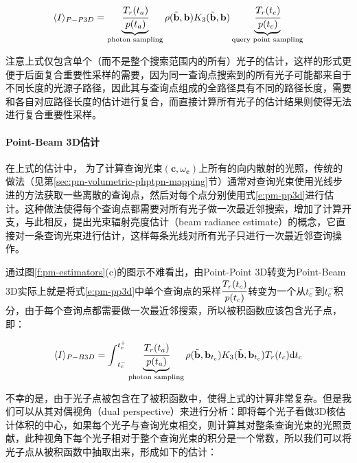\begin{equation}\label{e:pm-pp3d}
	\langle I\rangle_{P-P3D}=\underbrace{ \cfrac{T_r(t_a)}{p(t_a)}}_{\text{photon sampling}}\rho(\tilde{\mathbf{b}},\mathbf{b})K_3(\tilde{\mathbf{b}},\mathbf{b})\underbrace{ \cfrac{T_r(t_c)}{p(t_c)}}_{\text{query point sampling}}
\end{equation}

注意上式仅包含单个（而不是整个搜索范围内的所有）光子的估计，这样的形式更便于后面复合重要性采样的需要，因为同一查询点搜索到的所有光子可能都来自于不同长度的光源子路径，因此其与查询点组成的全路径具有不同的路径长度，需要和各自对应路径长度的估计进行复合，而直接计算所有光子的估计结果则使得无法进行复合重要性采样。




\paragraph{Point-Beam 3D估计}
在上式的估计中， 为了计算查询光束$(\mathbf{c},\omega_{\mathbf{c}})$上所有的向内散射的光照，传统的做法（见第\ref{sec:pm-volumetric-phptpn-mapping}节）通常对查询光束使用光线步进的方法获取一些离散的查询点，然后对每个点分别使用式\ref{e:pm-pp3d}进行估计。这种做法使得每个查询点都需要对所有光子做一次最近邻搜索，增加了计算开支，与此相反，\cite{a:TheBeamRadianceEstimateforVolumetricPhotonMapping}提出光束辐射亮度估计（beam radiance estimate）的概念，它直接对一条查询光束进行估计，这样每条光线对所有光子只进行一次最近邻查询操作。

通过图\ref{f:pm-estimators}(c)的图示不难看出，由Point-Point 3D转变为Point-Beam 3D实际上就是将式\ref{e:pm-pp3d}中单个查询点的采样$ \cfrac{T_r(t_c)}{p(t_c)}$转变为一个从$t^{-}_c$到$t^{-}_c$积分，由于每个查询点都需要做一次最近邻搜索，所以被积函数应该包含光子点，即：

\begin{equation*}
	\langle I\rangle_{P-B3D}={\rm \int}^{t^{+}_{c}}_{t^{-}_{c}}\underbrace{ \cfrac{T_r(t_a)}{p(t_a)}}_{\text{photon sampling}}\rho(\tilde{\mathbf{b}},\mathbf{b}_{t_c})K_3(\tilde{\mathbf{b}},\mathbf{b}_{t_c})T_r(t_c){\rm d}t_c
\end{equation*}

不幸的是，由于光子点被包含在了被积函数中，使得上式的计算非常复杂。但是我们可以从其对偶视角（dual perspective）来进行分析：即将每个光子看做3D核估计体积的中心，如果每个光子与查询光束相交，则计算其对整条查询光束的光照贡献，此种视角下每个光子相对于整个查询光束的积分是一个常数，所以我们可以将光子点从被积函数中抽取出来，形成如下的估计：

